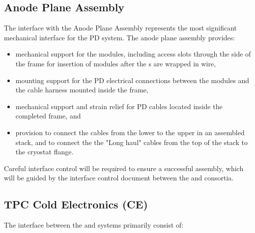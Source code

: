 \subsection{Anode Plane Assembly}

The interface with the Anode Plane Assembly represents the most significant mechanical interface for the PD system.  The anode plane assembly provides:

\begin{itemize}

\item mechanical support for the  modules, including access slots through the side of the frame for insertion of modules after the s are wrapped in wire,

\item mounting support for the PD electrical connections between the  modules and the cable harness mounted inside the  frame,

\item mechanical support and strain relief for PD cables located inside the completed  frame, and

\item provision to connect the  cables from the lower  to the upper  in an assembled  stack, and to connect the the "Long haul" cables from the top of the  stack to the cryostat flange.

\end{itemize}

Careful interface control will be required to ensure a successful assembly, which will be guided by the interface control document between the  and  consortia.





\subsection{TPC Cold Electronics (CE)}
\label{sec:fdsp-pd-intfc-ce}



The interface between the  and  systems primarily consist of:

